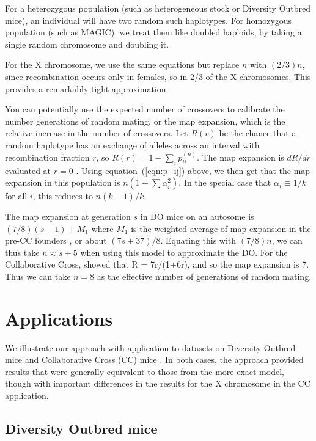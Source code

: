 \documentclass[12pt,letterpaper]{article}\usepackage[]{graphicx}\usepackage[table]{xcolor}
\begin{document}
For a heterozygous population (such as heterogeneous stock or
Diversity Outbred mice), an individual will have two random such
haplotypes. For homozygous population (such as MAGIC), we treat them like
doubled haploids, by taking a single random chromosome and doubling
it.

For the X chromosome, we use the same equations but replace $n$ with
$(2/3)n$, since recombination occurs only in females, so in 2/3 of the
X chromosomes. This provides a remarkably tight approximation.

You can potentially use the expected number of crossovers to calibrate
the number generations of random mating, or the map expansion, which
is the relative increase in the number of crossovers. Let $R(r)$ be
the chance that a random haplotype has an exchange of alleles across
an interval with recombination fraction $r$, so $R(r) = 1 - \sum_i
p_{ii}^{(n)}$. The map expansion is $dR/dr$ evaluated at $r=0$
\citep[see][]{teuscher2007}. Using equation~(\ref{eqn:p_ij}) above, we
then get that the map expansion in this population is $n (1 -
\sum\alpha_i^2)$. In the special case that $\alpha_i \equiv 1/k$ for
all $i$, this reduces to $n (k-1)/k$.

The map expansion at generation $s$ in DO mice on an autosome is
$(7/8)(s-1) + M_1$ where $M_1$ is the weighted average of map
expansion in the pre-CC founders \citep{broman2012b}, or about $(7s +
37)/8$. Equating this with $(7/8)n$, we can thus take $n \approx s +
5$ when using this model to approximate the DO. For the Collaborative
Cross, \citet{broman2005} showed that R = 7r/(1+6r), and so the map
expansion is 7. Thus we can take $n=8$ as the effective number of
generations of random mating.


\clearpage
\section*{Applications}

We illustrate our approach with application to datasets on Diversity
Outbred mice \citep{albarghouthi2021} and Collaborative Cross (CC) mice
\citep{srivastava2017}. In both cases, the approach provided results
that were generally equivalent to those from the more exact model, though with
important differences in the results for the X chromosome in the
CC application.

\subsection*{Diversity Outbred mice}
\end{document}

